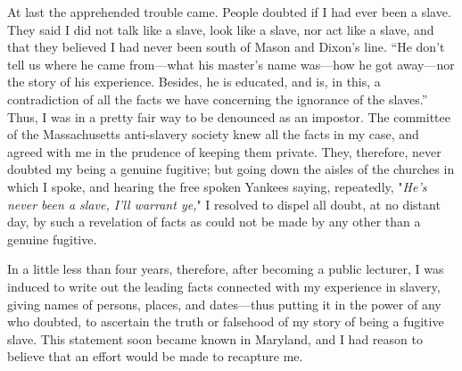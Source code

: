 At last the apprehended trouble came. People doubted if I had ever been
a slave. They said I did not talk like a slave, look like a slave, nor
act like a slave, and that they believed I had never been south of Mason
and Dixon's line. ``He don't tell us where he came from---what his
master's name was---how he got away---nor the story of his experience.
Besides, he is educated, and is, in this, a contradiction of all the
facts we have concerning the ignorance of the slaves.'' Thus, I was in a
pretty fair way to be denounced as an impostor. The committee of the
Massachusetts anti-slavery society knew all the facts in my case, and
agreed with me in the prudence of keeping them private. They, therefore,
never doubted my being a genuine fugitive; but going down the aisles of
the churches in which I spoke, and hearing the {}free spoken Yankees
saying, repeatedly, "\emph{He's never been a slave, I'll warrant ye,}" I
resolved to dispel all doubt, at no distant day, by such a revelation of
facts as could not be made by any other than a genuine fugitive.

In a little less than four years, therefore, after becoming a public
lecturer, I was induced to write out the leading facts connected with my
experience in slavery, giving names of persons, places, and dates---thus
putting it in the power of any who doubted, to ascertain the truth or
falsehood of my story of being a fugitive slave. This statement soon
became known in Maryland, and I had reason to believe that an effort
would be made to recapture me.

